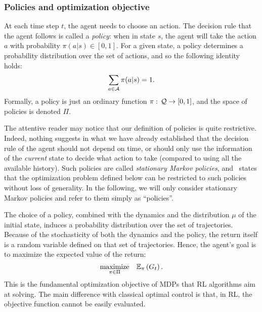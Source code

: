 		\subsubsection{Policies and optimization objective} 
			At each time step $t$, the agent needs to choose an action. The decision rule that the agent follows is called a\emph{ policy}: when in state $s$, the agent will take the action $a$ with probability $\pi(a|s)\in[0,1]$. For a given state, a policy determines a probability distribution over the set of actions, and so the following identity holds:
			\begin{equation*}
			\sum_{a\in\mathcal{A}}\pi(a|s) = 1.
			\end{equation*} 
			Formally, a policy is just an ordinary function $\pi:\,\mathcal{Q}\to[0,1]$, and the space of policies is denoted $\Pi$.\par
			The attentive reader may notice that our definition of policies is quite restrictive. Indeed, nothing suggests in what we have already established that the decision rule of the agent should not depend on time, or should only use the information of the\emph{ current} state to decide what action to take (compared to using all the available history). Such policies are called\emph{ stationary Markov policies}, and~\cite[Theorem\,2.1]{altman1999constrained} states that the optimization problem defined below can be restricted to such policies without loss of generality. In the following, we will only consider stationary Markov policies and refer to them simply as \enquote{policies}.\par
			The choice of a policy, combined with the dynamics and the distribution $\mu$ of the initial state, induces a probability distribution over the set of trajectories. Because of the stochasticity of both the dynamics and the policy, the return itself is a random variable defined on that set of trajectories. Hence, the agent's goal is to maximize the expected value of the return:
			\begin{equation}
					\underset{\pi\in\Pi}{\text{maximize}}\quad\mathbb{E}_\pi\left(G_t\right). \label{eq:mdp problem}
			\end{equation}
			This is the fundamental optimization objective of MDPs that RL algorithms aim at solving. The main difference with classical optimal control is that, in RL, the objective function cannot be easily evaluated.
